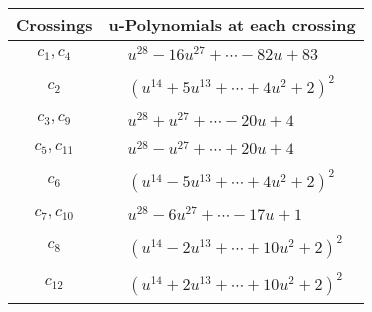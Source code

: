 \documentclass[1p]{elsarticle_modified}
\theoremstyle{definition}
\begin{document}
\begin{tabular}{m{50pt}|m{274pt}}
Crossings & \hspace{64pt}u-Polynomials at each crossing \\
\hline $$\begin{aligned}c_{1},c_{4}\end{aligned}$$&$\begin{aligned}
&u^{28}-16 u^{27}+\cdots-82 u+83
\end{aligned}$\\
\hline $$\begin{aligned}c_{2}\end{aligned}$$&$\begin{aligned}
&(u^{14}+5 u^{13}+\cdots+4 u^2+2)^{2}
\end{aligned}$\\
\hline $$\begin{aligned}c_{3},c_{9}\end{aligned}$$&$\begin{aligned}
&u^{28}+u^{27}+\cdots-20 u+4
\end{aligned}$\\
\hline $$\begin{aligned}c_{5},c_{11}\end{aligned}$$&$\begin{aligned}
&u^{28}- u^{27}+\cdots+20 u+4
\end{aligned}$\\
\hline $$\begin{aligned}c_{6}\end{aligned}$$&$\begin{aligned}
&(u^{14}-5 u^{13}+\cdots+4 u^2+2)^{2}
\end{aligned}$\\
\hline $$\begin{aligned}c_{7},c_{10}\end{aligned}$$&$\begin{aligned}
&u^{28}-6 u^{27}+\cdots-17 u+1
\end{aligned}$\\
\hline $$\begin{aligned}c_{8}\end{aligned}$$&$\begin{aligned}
&(u^{14}-2 u^{13}+\cdots+10 u^2+2)^{2}
\end{aligned}$\\
\hline $$\begin{aligned}c_{12}\end{aligned}$$&$\begin{aligned}
&(u^{14}+2 u^{13}+\cdots+10 u^2+2)^{2}
\end{aligned}$\\
\hline
\end{tabular}\\~\\
\end{document}
